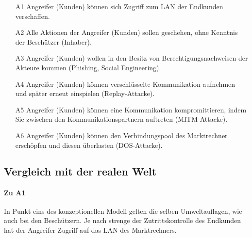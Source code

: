 \documentclass[11pt,a4paper]{report}
\begin{document}
\begin{enumerate}[leftmargin=*]
\item[A1] Angreifer (Kunden) können sich Zugriff zum LAN der Endkunden verschaffen.
\item[A2] Alle Aktionen der Angreifer (Kunden) sollen geschehen, ohne Kenntnis der Beschützer (Inhaber).
\item[A3] Angreifer (Kunden) wollen in den Besitz von Berechtigungsnachweisen der Akteure kommen (Phishing, Social Engineering).
\item[A4] Angreifer (Kunden) können verschlüsselte Kommunikation aufnehmen und später erneut einspielen (Replay-Attacke).
\item[A5] Angreifer (Kunden) können eine Kommunikation kompromittieren, indem Sie zwischen den Kommunikationspartnern auftreten (MITM-Attacke).
\item[A6] Angreifer (Kunden) können den Verbindungspool des Marktrechner erschöpfen und diesen überlasten (DOS-Attacke).
\end{enumerate}

\subsection{Vergleich mit der realen Welt}

\paragraph{Zu A1} In Punkt eins des konzeptionellen Modell gelten die selben Umweltauflagen, wie auch bei den Beschützern. Je nach strenge der Zutrittskontrolle des Endkunden hat der Angreifer Zugriff auf das LAN des Marktrechners.
\end{document}
